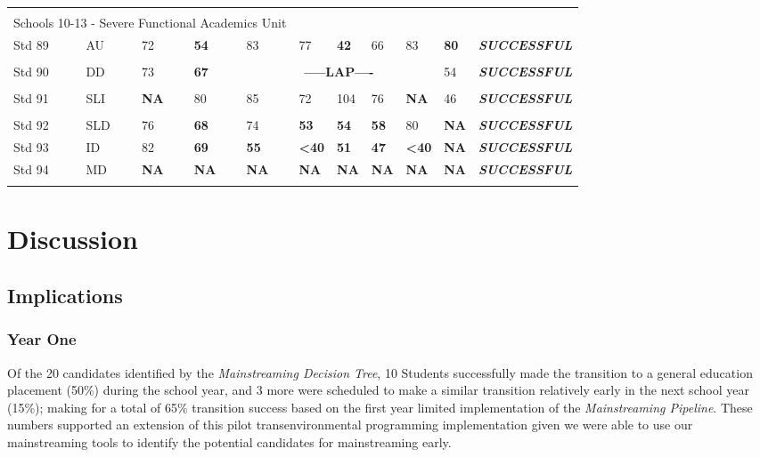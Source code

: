 \documentclass[twoside]{article}
\begin{document}
\begin{tiny}
\begin{landscape}
\begin{longtable}{p{1.5cm}p{1.5cm}p{1.5cm}p{1.5cm}p{1.75cm}p{1.75cm}p{1.75cm}p{1.75cm}p{1.75cm}p{1.75cm}p{2.5cm}@{}}
\hline \\
%
\multicolumn {5}{l}{Schools 10-13 - Severe Functional Academics Unit} & & & & & &\\
\cmidrule(lr){1-2}
Std 89 & AU & 72 & \textbf{54} & 83 & 77 & \textbf{42} & 66 & 83 & \textbf{80} & \textbf{\textit{SUCCESSFUL}}\\
\hline\\
Std 90 & DD & 73 & \textbf{67} & \multicolumn{5}{c}{\textbf{-----LAP----}}& 54 & \textbf{\textit{SUCCESSFUL}} \\
\hline\\
Std 91 & SLI & \textbf{NA} & 80 & 85 & 72 & 104 & 76 & \textbf{NA} & 46 & \textbf{\textit{SUCCESSFUL}} \\
\hline\\
Std 92 & SLD & 76 & \textbf{68} & 74 & \textbf{53} & \textbf{54} & \textbf{58} & 80 & \textbf{NA} & \textbf{\textit{SUCCESSFUL}} \\
Std 93 & ID & 82 & \textbf{69} & \textbf{55} & \textbf{<40} & \textbf{51} & \textbf{47} & \textbf{<40} & \textbf{NA}  & \textbf{\textit{SUCCESSFUL}} \\
Std 94 & MD & \textbf{NA} & \textbf{NA} & \textbf{NA} & \textbf{NA} & \textbf{NA} & \textbf{NA} & \textbf{NA} & \textbf{NA} & \textbf{\textit{SUCCESSFUL}} \\
\hline \\
%
\end{longtable}
\end{landscape}
\end{tiny}
%
%
%
%
\section{Discussion}
\subsection{Implications}
\subsubsection{Year One}
Of the 20 candidates identified by the \textit{Mainstreaming Decision Tree}, 10 Students successfully made the transition to a general education placement (50\%) during the school year, and 3 more were scheduled to make a similar transition relatively early in the next school year (15\%); making for a total of 65\% transition success based on the first year limited implementation of the \textit{Mainstreaming Pipeline}. These numbers supported an extension of this pilot transenvironmental programming implementation given we were able to use our mainstreaming tools to identify the potential candidates for mainstreaming early.
\end{document}
